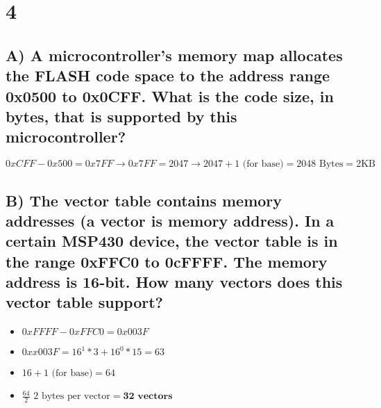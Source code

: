 \documentclass{article}
\begin{document}
\section{4}
\subsection{A) A microcontroller's memory map allocates the FLASH code space to the address range 0x0500 to 0x0CFF. What is the code size, in bytes, that is supported by this microcontroller?}
$$ 0xCFF - 0x500 = 0x7FF \rightarrow 0x7FF = 2047 \rightarrow 2047 + 1\text{ (for base)} = 2048\text{ Bytes} = 2\text{KB} $$

\subsection{B) The vector table contains memory addresses (a vector is memory address). In a certain MSP430 device, the vector table is in the range 0xFFC0 to 0cFFFF. The memory address is 16-bit. How many vectors does this vector table support?}
\begin{itemize}
	\item $ 0xFFFF-0xFFC0 = 0x003F $
 	\item $ 0xx003F = 16^1*3 + 16^0*15 = 63 $
	\item $ 16 + 1\text{ (for base)} = 64$
	\item $ \frac{64}{2}\text{ 2 bytes per vector} = \textbf{32 vectors}$ 
\end{itemize}
\end{document}
